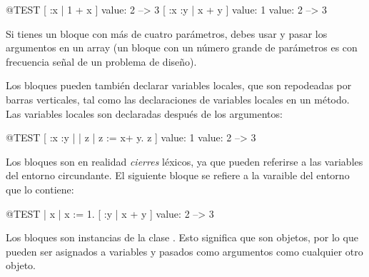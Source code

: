 \documentclass[a4paper,10pt,twoside]{book}
\begin{document}
\begin{code}{@TEST}
[ :x | 1 + x ] value: 2 --> 3
[ :x :y | x + y ] value: 1 value: 2 --> 3
\end{code}

Si tienes un bloque con m\'as de cuatro par\'ametros, debes usar  y pasar los argumentos en un array (un bloque con un n\'umero grande de par\'ametros es con frecuencia se\~nal de un problema de dise\~no).

Los bloques pueden tambi\'en declarar variables locales, que son repodeadas por barras verticales, tal como las declaraciones de variables locales en un m\'etodo.
Las variables locales son declaradas despu\'es de los argumentos:

\begin{code}{@TEST}
[ :x :y | | z | z := x+ y. z ] value: 1 value: 2 --> 3
\end{code}

Los bloques son en realidad \emph{cierres} l\'exicos, ya que pueden referirse a las variables del entorno circundante. El siguiente bloque se refiere a la varaible  del entorno que lo contiene:

\begin{code}{@TEST}
| x |
x := 1.
[ :y | x + y ] value: 2 --> 3
\end{code}

Los bloques son instancias de la clase .
Esto significa que son objetos, por lo que pueden ser asignados a variables y pasados como argumentos como cualquier otro objeto.


\end{document}
